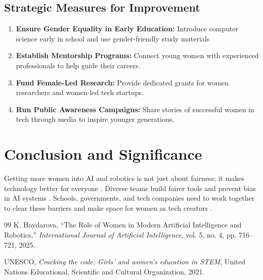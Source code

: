 \documentclass{article}
\begin{document}
 
\subsection{Strategic Measures for Improvement}
\begin{enumerate}
    \item \textbf{Ensure Gender Equality in Early Education:} Introduce computer science early in school and use gender-friendly study materials 
    \item \textbf{Establish Mentorship Programs:} Connect young women with experienced professionals to help guide their careers.
    \item \textbf{Fund Female-Led Research:} Provide dedicated grants for women researchers and women-led tech startups.
    \item \textbf{Run Public Awareness Campaigns:} Share stories of successful women in tech through media to inspire younger generations.
\end{enumerate}

\section{Conclusion and Significance}
Getting more women into AI and robotics is not just about fairness; it makes technology better for everyone \cite{haydarova2025}. Diverse teams build fairer tools and prevent bias in AI systems \cite{haydarova2025}. Schools, governments, and tech companies need to work together to clear these barriers and make space for women as tech creators \cite{haydarova2025}.

\begin{thebibliography}{99}
K. Haydarova, ``The Role of Women in Modern Artificial Intelligence and Robotics,'' \textit{International Journal of Artificial Intelligence}, vol. 5, no. 4, pp. 716--721, 2025.

UNESCO, \textit{Cracking the code: Girls' and women's education in STEM}, United Nations Educational, Scientific and Cultural Organization, 2021.
\end{thebibliography}
\end{document}
